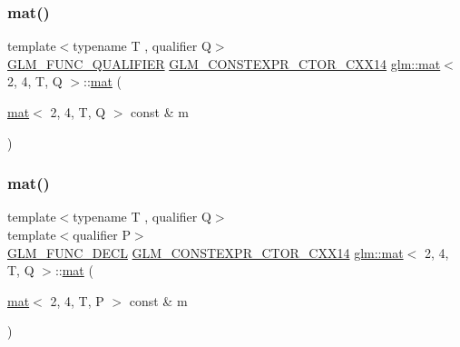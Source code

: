 \subsubsection{\texorpdfstring{mat()}{mat()}\hspace{0.1cm}{\footnotesize\ttfamily [2/21]}}
{\footnotesize\ttfamily template$<$typename T , qualifier Q$>$ \\
\hyperlink{setup_8hpp_a33fdea6f91c5f834105f7415e2a64407}{G\+L\+M\+\_\+\+F\+U\+N\+C\+\_\+\+Q\+U\+A\+L\+I\+F\+I\+ER} \hyperlink{setup_8hpp_a0900f9145e68bf6061b6f5e7be3fa751}{G\+L\+M\+\_\+\+C\+O\+N\+S\+T\+E\+X\+P\+R\+\_\+\+C\+T\+O\+R\+\_\+\+C\+X\+X14} \hyperlink{structglm_1_1mat}{glm\+::mat}$<$ 2, 4, T, Q $>$\+::\hyperlink{structglm_1_1mat}{mat} (\begin{DoxyParamCaption}\item[{\hyperlink{structglm_1_1mat}{mat}$<$ 2, 4, T, Q $>$ const \&}]{m }\end{DoxyParamCaption})}

\mbox{\label{structglm_1_1mat_3_012_00_014_00_01_t_00_01_q_01_4_a5401c74b80f80ee197c8e83e3003cfe9}} 
\subsubsection{\texorpdfstring{mat()}{mat()}\hspace{0.1cm}{\footnotesize\ttfamily [3/21]}}
{\footnotesize\ttfamily template$<$typename T , qualifier Q$>$ \\
template$<$qualifier P$>$ \\
\hyperlink{setup_8hpp_ab2d052de21a70539923e9bcbf6e83a51}{G\+L\+M\+\_\+\+F\+U\+N\+C\+\_\+\+D\+E\+CL} \hyperlink{setup_8hpp_a0900f9145e68bf6061b6f5e7be3fa751}{G\+L\+M\+\_\+\+C\+O\+N\+S\+T\+E\+X\+P\+R\+\_\+\+C\+T\+O\+R\+\_\+\+C\+X\+X14} \hyperlink{structglm_1_1mat}{glm\+::mat}$<$ 2, 4, T, Q $>$\+::\hyperlink{structglm_1_1mat}{mat} (\begin{DoxyParamCaption}\item[{\hyperlink{structglm_1_1mat}{mat}$<$ 2, 4, T, P $>$ const \&}]{m }\end{DoxyParamCaption})}

\mbox{\label{structglm_1_1mat_3_012_00_014_00_01_t_00_01_q_01_4_ac4583ab3dc474e92f2b71aa640220316}} 
